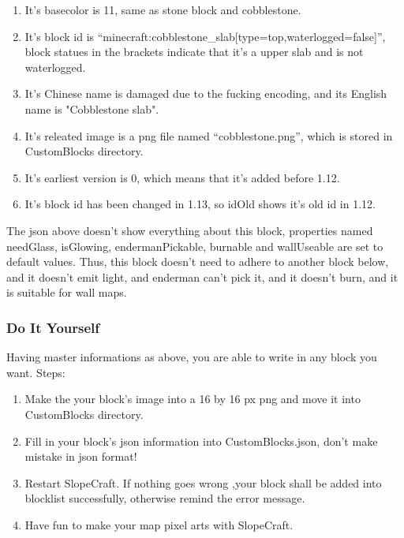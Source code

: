 \documentclass{article}
\begin{document}
    \begin{enumerate}
        \item It's basecolor is 11, same as stone block and cobblestone.
    
        \item It's block id is “minecraft:cobblestone\_slab[type=top,waterlogged=false]”, block statues in the brackets indicate that it's a upper slab and is not waterlogged.
    
        \item It's Chinese name is damaged due to the fucking encoding, and its English name is "Cobblestone slab".
    
        \item It's releated image is a png file named “cobblestone.png”, which is stored in CustomBlocks directory.
    
        \item It's earliest version is 0, which means that it's added before 1.12.
    
        \item It's block id has been changed in 1.13, so idOld shows it's old id in 1.12.

\end{enumerate}

    The json above doesn't show everything about this block, properties named needGlass, isGlowing, endermanPickable, burnable and wallUseable are set to default values. Thus, this block doesn't need to adhere to another block below, and it doesn't emit light, and enderman can't pick it, and it doesn't burn, and it is suitable for wall maps.

    \subsubsection{Do It Yourself}
    Having master informations as above, you are able to write in any block you want. Steps:

    \begin{enumerate}
        \item Make the your block's image into a 16 by 16 px png and move it into CustomBlocks directory.
        \item Fill in your block's json information into CustomBlocks.json, don't make mistake in json format!
        \item Restart SlopeCraft. If nothing goes wrong ,your block shall be added into blocklist successfully, otherwise remind the error message.
        \item Have fun to make your map pixel arts with SlopeCraft.
    \end{enumerate}
\end{document}
